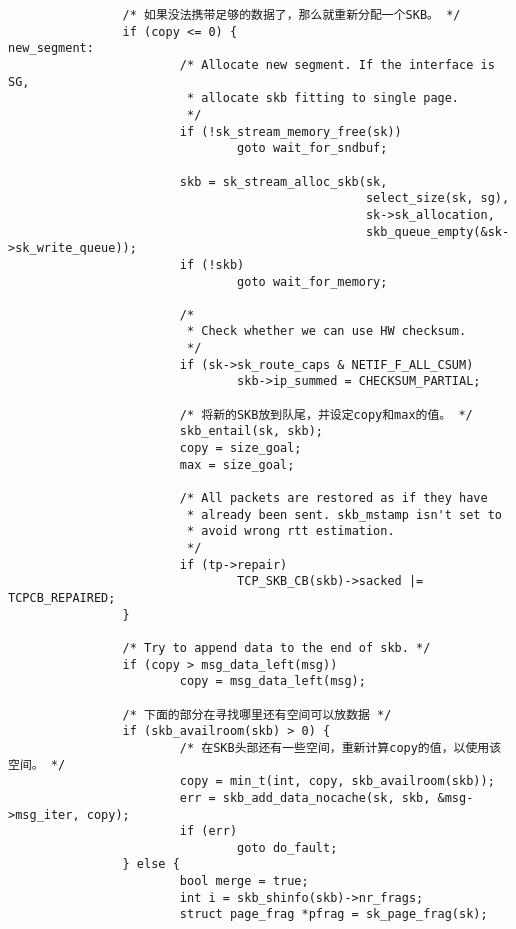 \begin{verbatim}
                /* 如果没法携带足够的数据了，那么就重新分配一个SKB。 */
                if (copy <= 0) {
new_segment:
                        /* Allocate new segment. If the interface is SG,
                         * allocate skb fitting to single page.
                         */
                        if (!sk_stream_memory_free(sk))
                                goto wait_for_sndbuf;

                        skb = sk_stream_alloc_skb(sk,
                                                  select_size(sk, sg),
                                                  sk->sk_allocation,
                                                  skb_queue_empty(&sk->sk_write_queue));
                        if (!skb)
                                goto wait_for_memory;

                        /*
                         * Check whether we can use HW checksum.
                         */
                        if (sk->sk_route_caps & NETIF_F_ALL_CSUM)
                                skb->ip_summed = CHECKSUM_PARTIAL;

                        /* 将新的SKB放到队尾，并设定copy和max的值。 */
                        skb_entail(sk, skb);
                        copy = size_goal;
                        max = size_goal;

                        /* All packets are restored as if they have
                         * already been sent. skb_mstamp isn't set to
                         * avoid wrong rtt estimation.
                         */
                        if (tp->repair)
                                TCP_SKB_CB(skb)->sacked |= TCPCB_REPAIRED;
                }

                /* Try to append data to the end of skb. */
                if (copy > msg_data_left(msg))
                        copy = msg_data_left(msg);

                /* 下面的部分在寻找哪里还有空间可以放数据 */
                if (skb_availroom(skb) > 0) {
                        /* 在SKB头部还有一些空间，重新计算copy的值，以使用该空间。 */
                        copy = min_t(int, copy, skb_availroom(skb));
                        err = skb_add_data_nocache(sk, skb, &msg->msg_iter, copy);
                        if (err)
                                goto do_fault;
                } else {
                        bool merge = true;
                        int i = skb_shinfo(skb)->nr_frags;
                        struct page_frag *pfrag = sk_page_frag(sk);


\end{verbatim}
